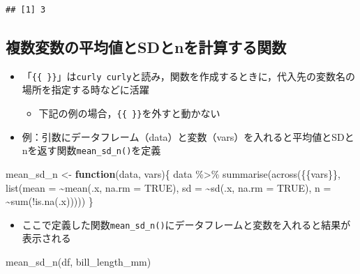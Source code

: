 \documentclass[
  xelatex,ja=standard, b5paper]{bxjsbook}
\newenvironment{Shaded}{\begin{snugshade}}{\end{snugshade}}
\newcommand{\AttributeTok}[1]{\textcolor[rgb]{0.77,0.63,0.00}{#1}}
\newcommand{\ConstantTok}[1]{\textcolor[rgb]{0.00,0.00,0.00}{#1}}
\newcommand{\ControlFlowTok}[1]{\textcolor[rgb]{0.13,0.29,0.53}{\textbf{#1}}}
\newcommand{\FunctionTok}[1]{\textcolor[rgb]{0.00,0.00,0.00}{#1}}
\newcommand{\NormalTok}[1]{#1}
\newcommand{\OtherTok}[1]{\textcolor[rgb]{0.56,0.35,0.01}{#1}}
\newcommand{\SpecialCharTok}[1]{\textcolor[rgb]{0.00,0.00,0.00}{#1}}
\providecommand{\tightlist}{%
  \setlength{\itemsep}{0pt}\setlength{\parskip}{0pt}}
\begin{document}
\begin{verbatim}
## [1] 3
\end{verbatim}

\hypertarget{su-fun-meansdn}{%
\subsection{複数変数の平均値とSDとnを計算する関数}\label{su-fun-meansdn}}

\begin{itemize}
\tightlist
\item
  「\texttt{\{\{\ \}\}}」は\texttt{curly\ curly}と読み，関数を作成するときに，代入先の変数名の場所を指定する時などに活躍

  \begin{itemize}
  \tightlist
  \item
    下記の例の場合，\texttt{\{\{\ \}\}}を外すと動かない
  \end{itemize}
\item
  例：引数にデータフレーム（data）と変数（vars）を入れると平均値とSDとnを返す関数\texttt{mean\_sd\_n()}を定義
\end{itemize}

\begin{Shaded}
\begin{Highlighting}[]
\NormalTok{mean\_sd\_n }\OtherTok{\textless{}{-}} \ControlFlowTok{function}\NormalTok{(data, vars)\{}
\NormalTok{data }\SpecialCharTok{\%\textgreater{}\%} 
  \FunctionTok{summarise}\NormalTok{(}\FunctionTok{across}\NormalTok{(\{\{vars\}\},}
                   \FunctionTok{list}\NormalTok{(}\AttributeTok{mean =} \SpecialCharTok{\textasciitilde{}}\FunctionTok{mean}\NormalTok{(.x, }\AttributeTok{na.rm =} \ConstantTok{TRUE}\NormalTok{),}
                        \AttributeTok{sd =} \SpecialCharTok{\textasciitilde{}}\FunctionTok{sd}\NormalTok{(.x, }\AttributeTok{na.rm =} \ConstantTok{TRUE}\NormalTok{),}
                        \AttributeTok{n =} \SpecialCharTok{\textasciitilde{}}\FunctionTok{sum}\NormalTok{(}\SpecialCharTok{!}\FunctionTok{is.na}\NormalTok{(.x)))))}
\NormalTok{\}}
\end{Highlighting}
\end{Shaded}

\begin{itemize}
\tightlist
\item
  ここで定義した関数\texttt{mean\_sd\_n()}にデータフレームと変数を入れると結果が表示される
\end{itemize}

\begin{Shaded}
\begin{Highlighting}[]
\FunctionTok{mean\_sd\_n}\NormalTok{(df, bill\_length\_mm)}
\end{Highlighting}
\end{Shaded}
\end{document}
